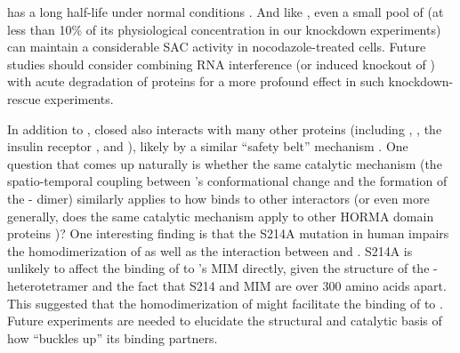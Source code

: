  has a long half-life under normal conditions \cite{MAD1MAD2Half-life}. And like  \cite{Raaijmakers2018, RZZ-MAD1vsBUB1-MAD1_2018, TraceBub1}, even a small pool of  (at less than 10\% of its physiological concentration in our knockdown experiments) can maintain a considerable SAC activity in nocodazole-treated cells. Future studies should consider combining RNA interference (or induced knockout of ) with acute degradation of  proteins for a more profound effect in such knockdown-rescue experiments. %

In addition to , closed  also interacts with many other proteins (including ,  \cite{SGO2-MAD2}, the insulin receptor \cite{MCC_IREndocytosis}, and  \cite{KIF20A-MAD2}), likely by a similar ``safety belt'' mechanism \cite{Structure1GO4}. One question that comes up naturally is whether the same catalytic mechanism (the spatio-temporal coupling between 's conformational change and the formation of the - dimer) similarly applies to how  binds to other interactors (or even more generally, does the same catalytic mechanism apply to other HORMA domain proteins \cite{HORMAReview})? One interesting finding is that the S214A mutation in human  impairs the homodimerization of  as well as the interaction between  and  \cite{ATMPhosphorylatesMad1S214}. S214A is unlikely to affect the binding of  to 's MIM directly, given the structure of the - heterotetramer \cite{Structure1GO4} and the fact that S214 and MIM are over 300 amino acids apart. This suggested that the homodimerization of  might facilitate the binding of  to . Future experiments are needed to elucidate the structural and catalytic basis of how  ``buckles up'' its binding partners.


